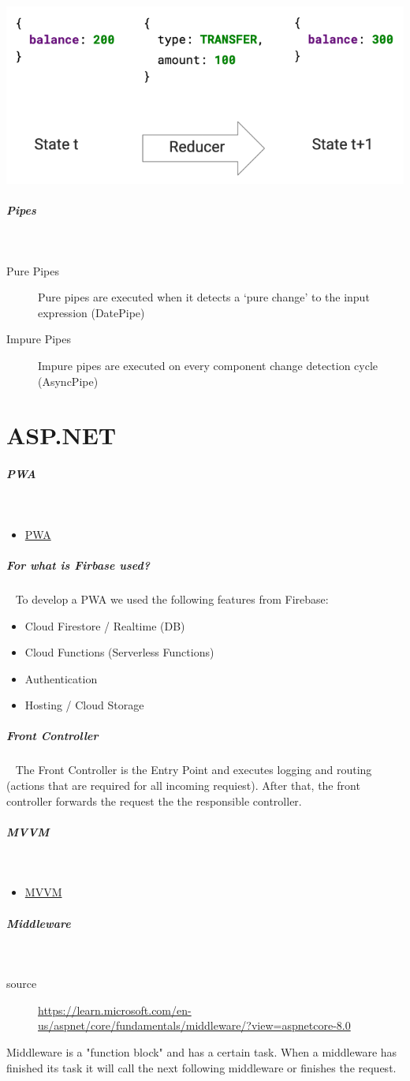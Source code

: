 \documentclass[11pt,twoside,landscape]{article}
\begin{document}
\begin{multicols}{3}
{
\begin{center}
\includegraphics[width=.9\linewidth]{img/redux_action_reducer.png}
\end{center}
\label{fig:action-reducer-state-change}
}
\subparagraph{Pipes} \
\label{sec:org2044586}
\begin{description}
\item[{Pure Pipes}] Pure pipes are executed when it detects a ‘pure change’ to the input expression (DatePipe)
\item[{Impure Pipes}] Impure pipes are executed on every component change detection cycle (AsyncPipe)
\end{description}
\section{ASP.NET}
\label{sec:org67123a9}
\subparagraph{PWA} \
\label{sec:org89a3753}
\begin{itemize}
\item \href{../../../roam/20240108155002-pwa.org}{PWA}
\end{itemize}
\subparagraph{For what is Firbase used?} \
\label{sec:orga07f33f}
To develop a PWA we used the following features from Firebase:
\begin{itemize}
\item Cloud Firestore / Realtime (DB)
\item Cloud Functions (Serverless Functions)
\item Authentication
\item Hosting / Cloud Storage
\end{itemize}
\subparagraph{Front Controller} \
\label{sec:orgb610e9d}
The Front Controller is the Entry Point and executes logging and routing (actions that are required for all incoming requiest).
After that, the front controller forwards the request the the responsible controller.
\subparagraph{MVVM} \
\label{sec:org24d67e3}
\begin{itemize}
\item \href{../../../roam/20211103140901-mvvm.org}{MVVM}
\end{itemize}
\subparagraph{Middleware} \
\label{sec:org7a32bef}
\begin{description}
\item[{source}] \url{https://learn.microsoft.com/en-us/aspnet/core/fundamentals/middleware/?view=aspnetcore-8.0}
\end{description}
Middleware is a "function block" and has a certain task.
When a middleware has finished its task it will call the next following middleware or finishes the request.


\end{multicols}
\end{document}
